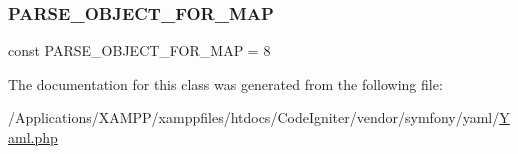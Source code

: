\subsubsection{\texorpdfstring{P\+A\+R\+S\+E\+\_\+\+O\+B\+J\+E\+C\+T\+\_\+\+F\+O\+R\+\_\+\+M\+AP}{PARSE\_OBJECT\_FOR\_MAP}}
{\footnotesize\ttfamily const P\+A\+R\+S\+E\+\_\+\+O\+B\+J\+E\+C\+T\+\_\+\+F\+O\+R\+\_\+\+M\+AP = 8}



The documentation for this class was generated from the following file\+:\begin{DoxyCompactItemize}
\item 
/\+Applications/\+X\+A\+M\+P\+P/xamppfiles/htdocs/\+Code\+Igniter/vendor/symfony/yaml/\mbox{\hyperlink{_yaml_8php}{Yaml.\+php}}\end{DoxyCompactItemize}
